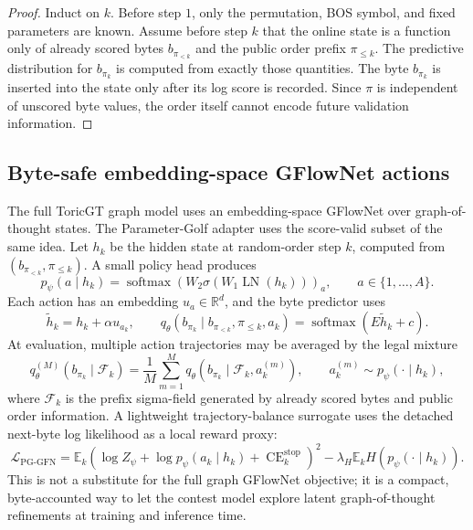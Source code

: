 \documentclass[11pt]{article}
\theoremstyle{definition}
\theoremstyle{plain}
\theoremstyle{remark}
\numberwithin{equation}{section}
\newcommand{\R}{\mathbb{R}}
\newcommand{\softmax}{\operatorname{softmax}}
\newcommand{\Eop}{\mathbb{E}}
\begin{document}
\begin{proof}
Induct on $k$.  Before step $1$, only the permutation, BOS symbol, and fixed parameters are known.  Assume before step $k$ that the online state is a function only of already scored bytes $b_{\pi_{<k}}$ and the public order prefix $\pi_{\le k}$.  The predictive distribution for $b_{\pi_k}$ is computed from exactly those quantities.  The byte $b_{\pi_k}$ is inserted into the state only after its log score is recorded.  Since $\pi$ is independent of unscored byte values, the order itself cannot encode future validation information.
\end{proof}

\subsection{Byte-safe embedding-space GFlowNet actions}

The full ToricGT graph model uses an embedding-space GFlowNet over graph-of-thought states.  The Parameter-Golf adapter uses the score-valid subset of the same idea.  Let $h_k$ be the hidden state at random-order step $k$, computed from $(b_{\pi_{<k}},\pi_{\le k})$.  A small policy head produces
\begin{equation}
  p_\psi(a\mid h_k)=\softmax(W_2\sigma(W_1\operatorname{LN}(h_k)))_a,
  \qquad a\in\{1,\ldots,A\}.
\end{equation}
Each action has an embedding $u_a\in\R^d$, and the byte predictor uses
\begin{equation}
  \widetilde h_k=h_k+\alpha u_{a_k},\qquad
  q_\theta(b_{\pi_k}\mid b_{\pi_{<k}},\pi_{\le k},a_k)=\softmax(E\widetilde h_k+c).
\end{equation}
At evaluation, multiple action trajectories may be averaged by the legal mixture
\begin{equation}
  q_\theta^{(M)}(b_{\pi_k}\mid\mathcal F_k)
  =\frac1M\sum_{m=1}^M q_\theta(b_{\pi_k}\mid \mathcal F_k,a_k^{(m)}),
  \qquad a_k^{(m)}\sim p_\psi(\cdot\mid h_k),
\end{equation}
where $\mathcal F_k$ is the prefix sigma-field generated by already scored bytes and public order information.  A lightweight trajectory-balance surrogate uses the detached next-byte log likelihood as a local reward proxy:
\begin{equation}
  \mathcal L_{\mathrm{PG\text{-}GFN}}
  =
  \Eop_k\left(\log Z_\psi+\log p_\psi(a_k\mid h_k)+
  \operatorname{CE}_k^\mathrm{stop}\right)^2
  -\lambda_H\Eop_k H(p_\psi(\cdot\mid h_k)).
\end{equation}
This is not a substitute for the full graph GFlowNet objective; it is a compact, byte-accounted way to let the contest model explore latent graph-of-thought refinements at training and inference time.
\end{document}
